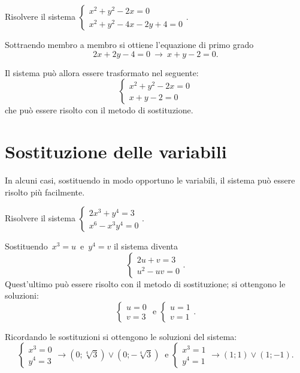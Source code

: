 \begin{exrig}
\begin{esempio}
Risolvere il sistema $\left\{\begin{array}{l}x^2+y^2-2x=0 \\x^2+y^2-4x-2y+4=0 \end{array}\right.$.

Sottraendo membro a membro si ottiene l'equazione di primo grado \[2x+2y-4=0~\rightarrow~ x+y-2=0.\]

Il sistema può allora essere trasformato nel seguente:
\[\left\{\begin{array}{l}x^2+y^2-2x=0 \\x+y-2=0 \end{array}\right.\]
che può essere risolto con il metodo di sostituzione.
\end{esempio}
\end{exrig}
\ovalbox{\risolvi \ref{ese:6.61}}
\pagebreak
\section{Sostituzione delle variabili}

In alcuni casi, sostituendo in modo opportuno le variabili, il sistema può essere risolto più facilmente.

\begin{exrig}
\begin{esempio}
Risolvere il sistema $\left\{\begin{array}{l}2x^3+y^4=3 \\x^6-x^3y^4=0 \end{array}\right.$.

Sostituendo~$x^{3}=u$~e~$y^{4}=v$ il sistema diventa
\[\left\{\begin{array}{l}2u+v=3 \\u^{2}-uv=0 \end{array}\right..\]
Quest'ultimo può essere risolto con il metodo di sostituzione; si ottengono le soluzioni:
\[\left\{\begin{array}{l}u=0 \\v=3 \end{array}\right.\text{ e }\left\{\begin{array}{l}u=1 \\v=1 \end{array}\right..\]

Ricordando le sostituzioni si ottengono le soluzioni del sistema:
\[\left\{\begin{array}{l}x^{3}=0 \\y^{4}=3\end{array}\right. \rightarrow \left(0;\sqrt[4]{3}\right)\vee\left(0;-\sqrt[4]{3}\right)~\text{ e }\left\{\begin{array}{l}x^{3}=1 \\y^{4}=1\end{array}\right.\rightarrow (1;1)\vee(1;-1).\]
\end{esempio}
\end{exrig}
\ovalbox{\risolvi \ref{ese:6.62}}

